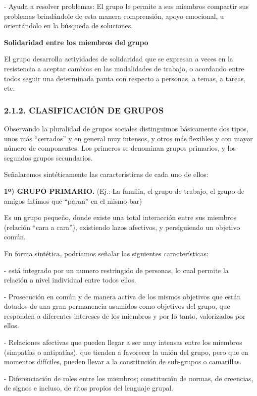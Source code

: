 - Ayuda a resolver problemas: El grupo le permite a sus miembros compartir sus problemas brindándole de esta manera comprensión, apoyo emocional, u orientándolo en la búsqueda de soluciones.

\textbf{Solidaridad entre los miembros del grupo}

El grupo desarrolla actividades de solidaridad que se expresan a veces en la resistencia a aceptar cambios en las modalidades de trabajo, o acordando entre todos seguir una determinada pauta con respecto a personas, a temas, a tareas, etc.

\subsubsection*{2.1.2. CLASIFICACIÓN DE GRUPOS}


Observando la pluralidad de grupos sociales distinguimos básicamente dos tipos, unos más “cerrados” y en general muy intensos, y otros más flexibles y con mayor número de componentes. Los primeros se denominan grupos primarios, y los segundos grupos secundarios.

Señalaremos sintéticamente las características de cada uno de ellos:

\textbf{1º) GRUPO PRIMARIO. }(Ej.: La familia, el grupo de trabajo, el grupo de amigos íntimos que “paran” en el mismo bar)

Es un grupo pequeño, donde existe una total interacción entre sus miembros (relación “cara a cara”), existiendo lazos afectivos, y persiguiendo un objetivo común.

En forma sintética, podríamos señalar las siguientes características:

-  está integrado por un numero restringido de personas, lo cual permite la relación a nivel individual entre todos ellos.

- Prosecución en común y de manera activa de los mismos objetivos que están dotados de una gran permanencia asumidos como objetivos del grupo, que responden a diferentes intereses de los miembros y por lo tanto, valorizados por ellos.

- Relaciones afectivas que pueden llegar a ser muy intensas entre los miembros (simpatías o antipatías), que tienden a favorecer la unión del grupo, pero que en momentos difíciles, pueden llevar a la constitución de sub-grupos o camarillas.

- Diferenciación de roles entre los miembros; constitución de normas, de creencias, de signos e incluso, de ritos propios del lenguaje grupal.

